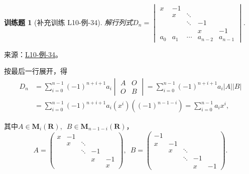 \documentclass[12pt,fontset=fandol]{ctexart}
\newtheorem{exercise}{训练题}[section]
\begin{document}
\begin{exercise}[补充训练 L10-例-34]\label{prob:L10-例-34}
解行列式$D_n=\begin{vmatrix}
            x     & -1    &        &         &         \\
                  & x     & \ddots &         &         \\
                  &       & \ddots & -1      &         \\
                  &       &        & x       & -1      \\
            a_{0} & a_{1} & \cdots & a_{n-2} & a_{n-1}
        \end{vmatrix}$.
\end{exercise}
\noindent 来源：\href{https://github.com/yhwu-is/Linear-Algebra-Left-Undone/blob/new/%E8%AE%B2%E4%B9%89/%E4%B8%93%E9%A2%98/10%20%E8%A1%8C%E5%88%97%E5%BC%8F.tex}{L10-例-34}。
\begin{solve}
按最后一行展开，得
    \begin{align*}
        D_n & =\sum_{i=0}^{n-1}(-1)^{n+i+1}a_i\begin{vmatrix} A & O \\ O & B \end{vmatrix}
        =\sum_{i=0}^{n-1}(-1)^{n+i+1}a_i|A||B|                                                        \\
            & =\sum_{i=0}^{n-1}(-1)^{n+i+1}a_i(x^i)\left((-1)^{n-1-i}\right) =\sum_{i=0}^{n-1}a_i x^i,
    \end{align*}

    其中$A\in \mathbf{M}_i(\mathbf{R}),\enspace B\in \mathbf{M}_{n-1-i}(\mathbf{R})$，
    \[ A=\begin{pmatrix}
            x & -1 &        &    &    \\
              & x  & \ddots &    &    \\
              &    & \ddots & -1 &    \\
              &    &        & x  & -1 \\
              &    &        &    & x
        \end{pmatrix},\enspace
        B=\begin{pmatrix}
            -1 &    &        &    &    \\
            x  & -1 &        &    &    \\
               & x  & \ddots &    &    \\
               &    & \ddots & -1 &    \\
               &    &        & x  & -1
        \end{pmatrix}. \]
\end{solve}
\end{document}
